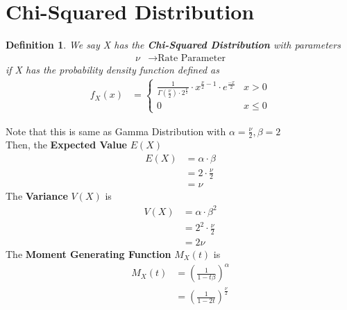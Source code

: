 \documentclass[11pt,oneside]{book}
\theoremstyle{break}
\theoremstyle{break}
\newtheorem{defn}{Definition}[corL]
\begin{document}
\section[Chi-Squared Distribution]{\color{DarkOrchid}Chi-Squared Distribution\color{black}}
\begin{defn}
We say X has the \textbf{Chi-Squared Distribution} with parameters\begin{align*}
\nu &\rightarrow \text{Rate Parameter}
\end{align*}
if X has the probability density function defined as \begin{align*}
f_X(x)&=\begin{cases}
\frac{1}{\Gamma\left(\frac{\nu}{2}\right)\cdot 2^{\frac{\nu}{2}}}\cdot x^{\frac{\nu}{2}-1}\cdot e^{\frac{-x}{2}}&x>0\\
0&x\leq 0
\end{cases}
\end{align*}
\end{defn}
Note that this is same as Gamma Distribution with $\alpha=\frac{\nu}{2},\beta=2$\\
Then, the \textbf{Expected Value }$E(X)$\begin{align*}
E(X)&=\alpha \cdot \beta \\
&=2\cdot \frac{\nu}{2}\\
&=\nu
\end{align*}
The \textbf{Variance} $V(X)$ is \begin{align*}
V(X)&=\alpha \cdot \beta^2\\
&=2^2\cdot \frac{\nu}{2}\\
&=2\nu
\end{align*}
The \textbf{Moment Generating Function} $M_X(t)$ is \begin{align*}
M_X(t)&=\left(\frac{1}{1-t\beta} \right)^{\alpha}\\
&=\left(\frac{1}{1-2t}\right)^{\frac{\nu}{2}}\\
\end{align*}
\end{document}
